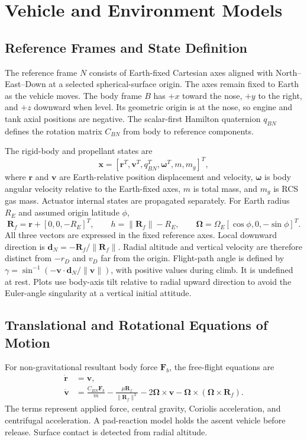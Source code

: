 \documentclass[11pt,letterpaper]{article}
\begin{document}
\section{Vehicle and Environment Models}\label{sec:models}
\subsection{Reference Frames and State Definition}
The reference frame $N$ consists of Earth-fixed Cartesian axes aligned with North--East--Down at a selected spherical-surface origin. The axes remain fixed to Earth as the vehicle moves. The body frame $B$ has $+x$ toward the nose, $+y$ to the right, and $+z$ downward when level. Its geometric origin is at the nose, so engine and tank axial positions are negative. The scalar-first Hamilton quaternion $q_{BN}$ defines the rotation matrix $C_{BN}$ from body to reference components.

The rigid-body and propellant states are
\begin{equation}
\bm{x}=\left[\bm r^T,\bm v^T,q_{BN}^T,\bm\omega^T,m,m_g\right]^T,
\end{equation}
where $\bm r$ and $\bm v$ are Earth-relative position displacement and velocity, $\bm\omega$ is body angular velocity relative to the Earth-fixed axes, $m$ is total mass, and $m_g$ is RCS gas mass. Actuator internal states are propagated separately. For Earth radius $R_E$ and assumed origin latitude $\phi$,
\begin{equation}
\bm R_f=\bm r+[0,0,-R_E]^T,\qquad
h=\|\bm R_f\|-R_E,\qquad
\bm\Omega=\Omega_E[\cos\phi,0,-\sin\phi]^T.
\end{equation}
All three vectors are expressed in the fixed reference axes. Local downward direction is $\bm d_N=-\bm R_f/\|\bm R_f\|$. Radial altitude and vertical velocity are therefore distinct from $-r_D$ and $v_D$ far from the origin. Flight-path angle is defined by $\gamma=\sin^{-1}(-\bm v\cdot\bm d_N/\|\bm v\|)$, with positive values during climb. It is undefined at rest. Plots use body-axis tilt relative to radial upward direction to avoid the Euler-angle singularity at a vertical initial attitude.

\subsection{Translational and Rotational Equations of Motion}
For non-gravitational resultant body force $\bm F_b$, the free-flight equations are
\begin{align}
\dot{\bm r}&=\bm v,\\
\dot{\bm v}&=\frac{C_{BN}\bm F_b}{m}
-\frac{\mu\bm R_f}{\|\bm R_f\|^3}
-2\bm\Omega\times\bm v
-\bm\Omega\times(\bm\Omega\times\bm R_f).\label{eq:translation}
\end{align}
The terms represent applied force, central gravity, Coriolis acceleration, and centrifugal acceleration. A pad-reaction model holds the ascent vehicle before release. Surface contact is detected from radial altitude.
\end{document}
